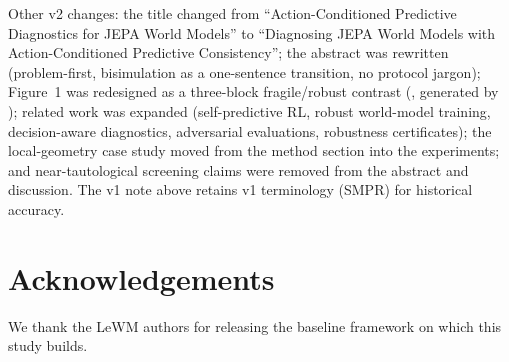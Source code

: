 Other v2 changes: the title changed from ``Action-Conditioned Predictive
Diagnostics for JEPA World Models'' to ``Diagnosing JEPA World Models with
Action-Conditioned Predictive Consistency''; the abstract was rewritten
(problem-first, bisimulation as a one-sentence transition, no protocol
jargon); Figure~1 was redesigned as a three-block fragile/robust contrast
(, generated by
); related work was
expanded (self-predictive RL, robust world-model training, decision-aware
diagnostics, adversarial evaluations, robustness certificates); the
local-geometry case study moved from the method section into the
experiments; and near-tautological screening claims were removed from the
abstract and discussion. The v1 note above retains v1 terminology (SMPR)
for historical accuracy.

\section*{Acknowledgements}

We thank the LeWM authors for releasing the baseline framework on which this study builds.
